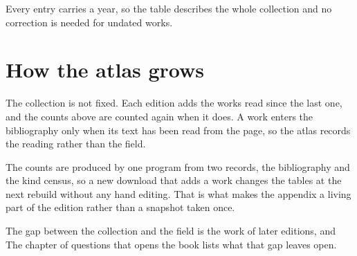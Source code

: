 Every entry carries a year, so the table describes the whole collection and %
no correction is needed for undated works. %

\section{How the atlas grows}

The collection is not fixed. %
Each edition adds the works read since the last one, and the counts above are %
counted again when it does. %
A work enters the bibliography only when its text has been read from the page, %
so the atlas records the reading rather than the field. %

The counts are produced by one program from two records, the bibliography and %
the kind census, so a new download that adds a work changes the tables at the %
next rebuild without any hand editing. %
That is what makes the appendix a living part of the edition rather than a %
snapshot taken once. %

The gap between the collection and the field is the work of later editions, and %
The chapter of questions that opens the book lists what that gap leaves open. %
